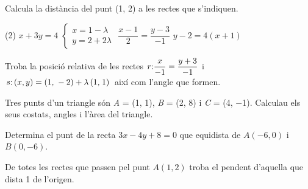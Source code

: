 \begin{mylist}
\exer   Calcula la distància del punt (1, 2) a les rectes que s'indiquen.
	\begin{tasks}(2)
		\task $x+3y=4$   \task $\left\{\begin{array}{l} {x=1-\lambda } \\ {y=2+2\lambda } \end{array}\right. $  \task $\dfrac{x-1}{2} =\dfrac{y-3}{-1} $  \task $y-2=4\left(x+1\right)$
	\end{tasks}

\answers[cols=1]{[$r:\,x+3y-4=0$; $d=\frac{3}{\sqrt{10}}$,
	$r:\,2x+y-4=0$; $d=0$,
	$r:\,x+2y-7=0$; $d=\frac{2\sqrt{5}}{5}$,
	$r:\,4x-y+6=0$; $d=\frac{8\sqrt{17}}{17}$ 
	]}

\exer  Troba la posició relativa de les rectes $r{\rm :}\dfrac{x}{-{\rm 1}} =\dfrac{y+{\rm 3}}{-{\rm 1}} $ i
$s{\rm :}\left(x,y\right)=\left({\rm 1,}\; -{\rm 2}\right)+\lambda \left({\rm 1,}\; {\rm 1}\right)$
així com l'angle que formen.


\exer  Tres punts d'un triangle són  \textit{A} = (1, 1), \textit{B} = (2, 8) i \textit{C} = (4, $-$1). 
Calculau els seus costats, angles i l'àrea del triangle. 


\exer Determina el punt de la recta $3x-4y+8=0$ que equidista de $A(-6,0)$ i $B(0,-6)$.


\exer[-1] De totes les rectes que passen pel punt $A(1,2)$ troba el pendent d'aquella que dista 1 de l'origen.



\end{mylist}
\pagebreak

